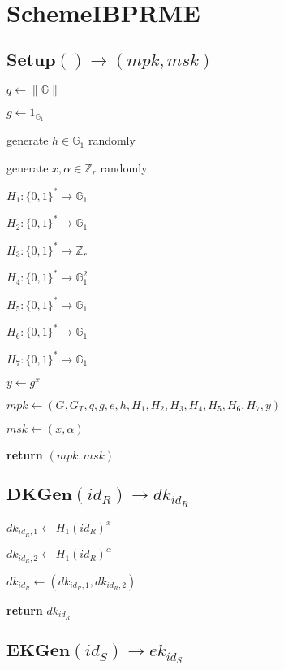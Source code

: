 \documentclass[a4paper]{article}
\begin{document}
\section{SchemeIBPRME}

\subsection{$\textbf{Setup}() \rightarrow (\textit{mpk}, \textit{msk})$}

$q \gets \|\mathbb{G}\|$

$g \gets 1_{\mathbb{G}_1}$

generate $h \in \mathbb{G}_1$ randomly

generate $x, \alpha \in \mathbb{Z}_r$ randomly

$H_1: \{0, 1\}^* \rightarrow \mathbb{G}_1$

$H_2: \{0, 1\}^* \rightarrow \mathbb{G}_1$

$H_3: \{0, 1\}^* \rightarrow \mathbb{Z}_r$

$H_4: \{0, 1\}^* \rightarrow \mathbb{G}_1^2$

$H_5: \{0, 1\}^* \rightarrow \mathbb{G}_1$

$H_6: \{0, 1\}^* \rightarrow \mathbb{G}_1$

$H_7: \{0, 1\}^* \rightarrow \mathbb{G}_1$

$y \gets g^x$

$ \textit{mpk} \gets (G, G_T, q, g, e, h, H_1, H_2, H_3, H_4, H_5, H_6, H_7, y)$

$\textit{msk} \gets (x, \alpha)$

\textbf{return} $(\textit{mpk}, \textit{msk})$

\subsection{$\textbf{DKGen}(\textit{id}_R) \rightarrow \textit{dk}_{\textit{id}_R}$}

$\textit{dk}_{\textit{id}_R, 1} \gets H_1(\textit{id}_R)^x$

$\textit{dk}_{\textit{id}_R, 2} \gets H_1(\textit{id}_R)^\alpha$

$\textit{dk}_{\textit{id}_R} \gets (\textit{dk}_{\textit{id}_R, 1}, \textit{dk}_{\textit{id}_R, 2})$

\textbf{return} $\textit{dk}_{\textit{id}_R}$

\subsection{$\textbf{EKGen}(\textit{id}_S) \rightarrow \textit{ek}_{\textit{id}_S}$}
\end{document}
